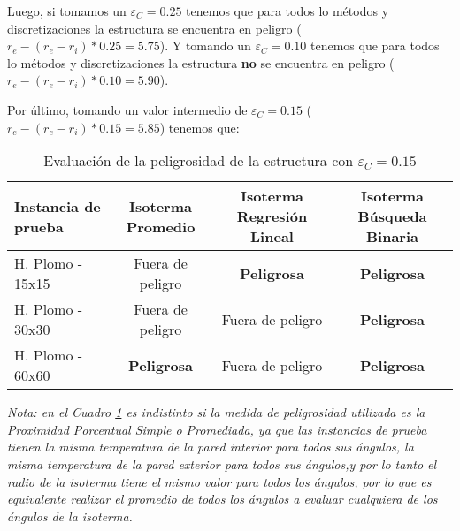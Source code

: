 Luego, si tomamos un $\varepsilon_C = 0.25$ tenemos que para todos lo métodos y discretizaciones la estructura se encuentra en peligro ($r_e - (r_e - r_i)*0.25 = 5.75$).
Y tomando un $\varepsilon_C = 0.10$ tenemos que para todos lo métodos y discretizaciones la estructura \textbf{no} se encuentra en peligro ($r_e - (r_e - r_i)*0.10 = 5.90$).

Por último, tomando un valor intermedio de $\varepsilon_C = 0.15$ ($r_e - (r_e - r_i)*0.15 = 5.85$) tenemos que:

\begin{table}[H]
    \begin{center}
        \begin{tabular}{| l | c | c | c |}
            \hline
            Instancia de prueba & Isoterma Promedio  & Isoterma Regresión Lineal & Isoterma Búsqueda Binaria \\ \hline
            H. Plomo - 15x15    & Fuera de peligro   & \textbf{Peligrosa}        & \textbf{Peligrosa}        \\
            H. Plomo - 30x30    & Fuera de peligro   & Fuera de peligro          & \textbf{Peligrosa}        \\
            H. Plomo - 60x60    & \textbf{Peligrosa} & Fuera de peligro          & \textbf{Peligrosa}        \\
            \hline
        \end{tabular}
        \captionsetup{justification=centering}
        \caption{Evaluación de la peligrosidad de la estructura con $\varepsilon_C = 0.15$}
        \label{tabla-peligro-estructura-plomo}
    \end{center}
\end{table}

\textit{Nota: en el Cuadro \ref{tabla-peligro-estructura-plomo} es indistinto si la medida de peligrosidad utilizada es la Proximidad Porcentual Simple o Promediada, ya que las instancias de prueba tienen la misma temperatura de la pared interior para todos sus ángulos, la misma temperatura de la pared exterior para todos sus ángulos,y por lo tanto el radio de la isoterma tiene el mismo valor para todos los ángulos, por lo que es equivalente realizar el promedio de todos los ángulos a evaluar cualquiera de los ángulos de la isoterma.}

\medskip

